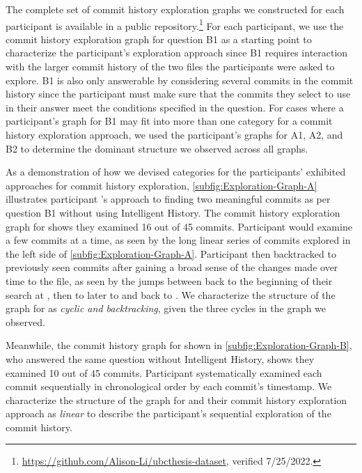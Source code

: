 The complete set of commit history exploration graphs we constructed
for each participant is available in a public repository.\footnote{\url{https://github.com/Alison-Li/ubcthesis-dataset}, verified 7/25/2022.}
For each participant, we use the commit history exploration graph for question B1
as a starting point to characterize the participant's exploration approach since
B1 requires interaction with the larger commit history of the two files the participants were asked to explore.
B1 is also only answerable by considering several commits in the commit history since the
participant must make sure that the commits they select to use in their answer meet the conditions specified in the question.
For cases where a participant's graph for B1 may fit into more than one category for a commit history exploration approach,
we used the participant's graphs for A1, A2, and B2 to determine the dominant structure we observed across all graphs.

As a demonstration of how we devised categories for the participants' exhibited approaches for commit history exploration, 
\autoref{subfig:Exploration-Graph-A} illustrates participant 's approach to finding 
two meaningful commits as per question B1 without using Intelligent History.
The commit history exploration graph for  shows they examined 16 out of 45 commits.
Participant  would examine a few commits at a time,
as seen by the long linear series of commits explored in the left side of \autoref{subfig:Exploration-Graph-A}.
Participant  then backtracked to previously seen commits 
after gaining a broad sense of the changes made over time to the file,
as seen by the jumps between  back to the beginning of their search at , 
then to later to  and back to .
We characterize the structure of the graph for  as \textit{cyclic and backtracking},
given the three cycles in the graph we observed.

Meanwhile, the commit history graph for  shown in \autoref{subfig:Exploration-Graph-B}, 
who answered the same question without Intelligent History, shows they examined 10 out of 45 commits.
Participant  systematically examined 
each commit sequentially in chronological order by each commit's timestamp.
We characterize the structure of the graph for  and their commit history exploration approach as \textit{linear} 
to describe the participant's sequential exploration of the commit history.

